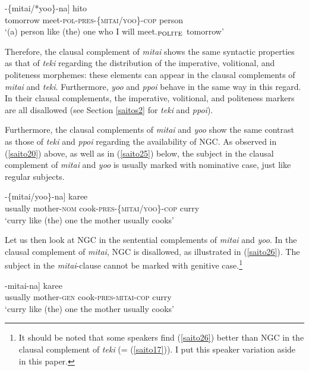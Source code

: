 \documentclass[output=paper]{langscibook}
\begin{document}
\begin{exe}
\ex \label{saito24}
\gll [[{asita} {a-mas-u}]-\{{mitai/*yoo}\}-{na}] {hito}\\
tomorrow meet-\textsc{pol-pres}-\{\textsc{mitai/yoo}\}-\textsc{cop} person\\ 
\glt ‘(a) person like (the) one who I will meet.$_{\textnormal{POLITE}}$ tomorrow’
\end{exe}

Therefore, the clausal complement of \emph{mitai} shows the same syntactic properties as that of \emph{teki} regarding the distribution of the imperative, volitional, and politeness morphemes: these elements can appear in the clausal complements of \emph{mitai} and \emph{teki}. Furthermore, \emph{yoo} and \emph{ppoi} behave in the same way in this regard. In their clausal complements, the imperative, volitional, and politeness markers are all disallowed (see Section \ref{saitos2} for \emph{teki} and \emph{ppoi}).

Furthermore, the clausal complements of \emph{mitai} and \emph{yoo} show the same contrast as those of \emph{teki} and \emph{ppoi} regarding the availability of NGC. As observed in (\ref{saito20}) above, as well as in (\ref{saito25}) below, the subject in the clausal complement of \emph{mitai} and \emph{yoo} is usually marked with nominative case, just like regular subjects.

\begin{exe}
\ex \label{saito25}
\gll [[{hudan} {okaasan-ga}   {tuku-ru}]-\{{mitai/yoo}\}-{na}] {karee}\\
usually mother-\textsc{nom} cook-\textsc{pres}-\{\textsc{mitai/yoo}\}-\textsc{cop} curry\\ 
\glt ‘curry like (the) one the mother usually cooks’
\end{exe}

Let us then look at NGC in the sentential complements of \emph{mitai} and \emph{yoo}. In the clausal complement of \emph{mitai}, NGC is disallowed, as illustrated in (\ref{saito26}). The subject in the \emph{mitai}-clause cannot be marked with genitive case.\footnote{It should be noted that some speakers find (\ref{saito26}) better than NGC in the clausal complement of \emph{teki} (= (\ref{saito17})). I put this speaker variation aside in this paper.} 

\begin{exe}
\ex \label{saito26}
\gll *[[{hudan} {okaasan-no} {tuku-ru}]-{mitai-na}] {karee}\\
usually mother-\textsc{gen} cook-\textsc{pres-mitai-cop} curry\\ 
\glt ‘curry like (the) one the mother usually cooks’
\end{exe}
\end{document}
